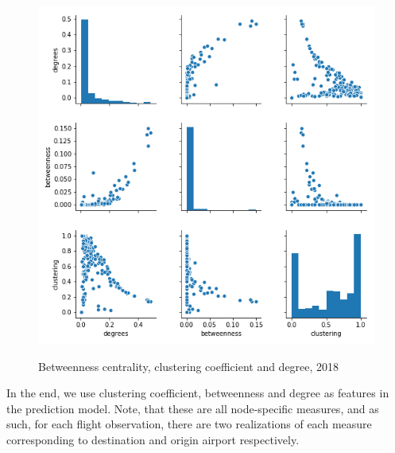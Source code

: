 \begin{figure}[H]
  \centering
  \caption{Betweenness centrality, clustering coefficient and degree, 2018}
    \includegraphics[width=1 \textwidth]{Exam/Figures/NxPairPlot.png}
  \label{fig:Btwns_CC}
\end{figure}
\noindent
In the end, we use clustering coefficient, betweenness and degree as features in the prediction model. Note, that these are all node-specific measures, and as such, for each flight observation, there are two realizations of each measure corresponding to destination and origin airport respectively.

